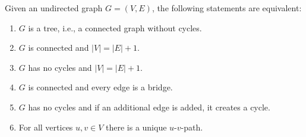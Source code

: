 \begin{theorem}\label{thm:characterization-of-trees}
  Given an undirected graph \(G = (V,E)\), the following statements are equivalent:
  \begin{enumerate}[label=\textbf{(\arabic*)}, itemindent=0.25cm, labelsep=0.25cm]
    \item \(G\) is a tree, i.e., a connected graph without cycles. \label{thm:char-tree-connected-graph-no-cycles}
    \item \(G\) is connected and \(|V| = |E| + 1\). \label{thm:char-tree-connected-v-e-1}
    \item \(G\) has no cycles and \(|V| = |E| + 1\). \label{thm:char-tree-no-cycles-v-e-1}
    \item \(G\) is connected and every edge is a bridge. \label{thm:char-tree-connected-bridge}
    \item \(G\) has no cycles and if an additional edge is added, it creates a cycle. \label{thm:char-tree-no-cycles-add-edge}
    \item For all vertices \(u,v\in V\) there is a unique \(u\)-\(v\)-path. \label{thm:char-tree-unique-path} \qedhere
  \end{enumerate}
\end{theorem}
